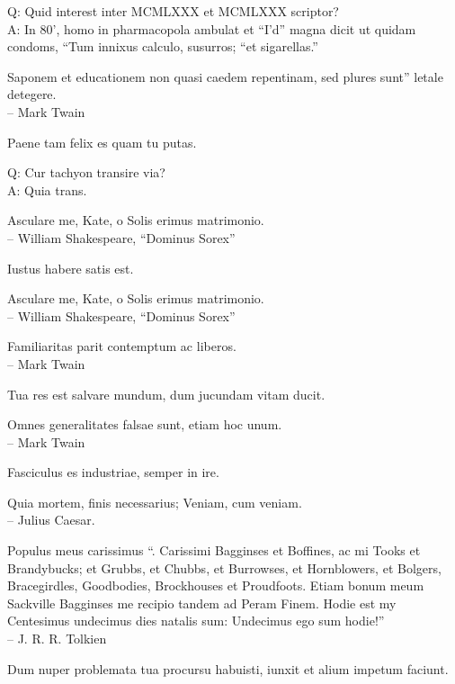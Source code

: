\documentclass[titlepage,12pt]{memoir}
\begin{document}
Q: Quid interest inter MCMLXXX et MCMLXXX scriptor?\\
A: In 80’, homo in pharmacopola ambulat et “I’d” magna dicit
ut quidam condoms, “Tum innixus calculo, susurros;
“et sigarellas.”

Saponem et educationem non quasi caedem repentinam, sed plures sunt”
letale detegere.
\\-- Mark Twain

Paene tam felix es quam tu putas.

Q: Cur tachyon transire via?\\
A: Quia trans.

Asculare me, Kate, o Solis erimus matrimonio.
\\-- William Shakespeare, “Dominus Sorex”

Iustus habere satis est.

Asculare me, Kate, o Solis erimus matrimonio.
\\-- William Shakespeare, “Dominus Sorex”

 Familiaritas parit contemptum ac liberos.
\\-- Mark Twain

Tua res est salvare mundum, dum jucundam vitam ducit.

Omnes generalitates falsae sunt, etiam hoc unum.
\\-- Mark Twain

Fasciculus es industriae, semper in ire.

Quia mortem, finis necessarius;
Veniam, cum veniam.
\\-- Julius Caesar.

 Populus meus carissimus “.
Carissimi Bagginses et Boffines, ac mi Tooks et Brandybucks;
et Grubbs, et Chubbs, et Burrowses, et Hornblowers, et Bolgers,
Bracegirdles, Goodbodies, Brockhouses et Proudfoots. Etiam bonum meum
Sackville Bagginses me recipio tandem ad Peram Finem. Hodie est my
Centesimus undecimus dies natalis sum: Undecimus ego sum hodie!”
\\-- J. R. R. Tolkien

Dum nuper problemata tua procursu habuisti, iunxit et
alium impetum faciunt.
\end{document}

